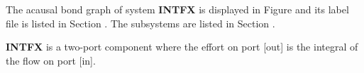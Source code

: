 

   The acausal bond graph of system \textbf{INTFX} is
   displayed in Figure  and its label
   file is listed in Section .
   The subsystems are listed in Section .

\textbf{INTFX} is a two-port component where the effort on port [out]
   is the integral of the flow on port [in].
